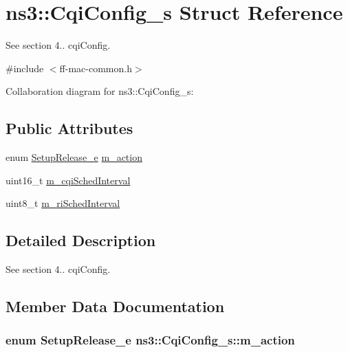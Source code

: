 \hypertarget{structns3_1_1CqiConfig__s}{}\section{ns3\+:\+:Cqi\+Config\+\_\+s Struct Reference}
\label{structns3_1_1CqiConfig__s}


See section 4.. cqi\+Config.  




{\ttfamily \#include $<$ff-\/mac-\/common.\+h$>$}



Collaboration diagram for ns3\+:\+:Cqi\+Config\+\_\+s\+:
\subsection*{Public Attributes}
\begin{DoxyCompactItemize}
\item 
enum \hyperlink{namespacens3_a19c98a2a7ba2ba8173e4b7ed3c0cef08}{Setup\+Release\+\_\+e} \hyperlink{structns3_1_1CqiConfig__s_a0adc5feaae40d4998262f0effac972c8}{m\+\_\+action}
\item 
uint16\+\_\+t \hyperlink{structns3_1_1CqiConfig__s_ac66d6b349497fddbda64354a7c648e33}{m\+\_\+cqi\+Sched\+Interval}
\item 
uint8\+\_\+t \hyperlink{structns3_1_1CqiConfig__s_a4c055f0c3423d2684c05684110ddc38e}{m\+\_\+ri\+Sched\+Interval}
\end{DoxyCompactItemize}


\subsection{Detailed Description}
See section 4.. cqi\+Config. 

\subsection{Member Data Documentation}
\subsubsection[{\texorpdfstring{m\+\_\+action}{m_action}}]{\setlength{\rightskip}{0pt plus 5cm}enum {\bf Setup\+Release\+\_\+e} ns3\+::\+Cqi\+Config\+\_\+s\+::m\+\_\+action}\hypertarget{structns3_1_1CqiConfig__s_a0adc5feaae40d4998262f0effac972c8}{}\label{structns3_1_1CqiConfig__s_a0adc5feaae40d4998262f0effac972c8}
